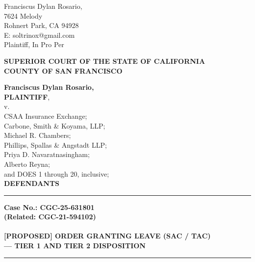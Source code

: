 

\nolinenumbers
\begin{singlespace}
Franciscus Dylan Rosario, \\
7624 Melody \\
Rohnert Park, CA 94928 \\
E: soltrinox@gmail.com \\
Plaintiff, In Pro Per \\
\end{singlespace}
\vspace*{9mm}
\begin{tightcenter}
\textbf{SUPERIOR COURT OF THE STATE OF CALIFORNIA} \\
\textbf{COUNTY OF SAN FRANCISCO}
\end{tightcenter}
\vspace*{2.25mm}
\nolinenumbers
\begin{minipage}[t]{3in}
    \raggedright
    \textbf{Franciscus Dylan Rosario,} \\ \textbf{PLAINTIFF}, \\
    \hspace{1cm} v. \\
    \small
    CSAA Insurance Exchange; \\
    Carbone, Smith \& Koyama, LLP; \\
    Michael R. Chambers; \\
    Phillips, Spallas \& Angstadt LLP; \\
    Priya D. Navaratnasingham; \\
    Alberto Reyna; \\
    and DOES 1 through 20, inclusive; \\
    \normalsize
    \textbf{DEFENDANTS}
    \makebox[3in]{\hrulefill}
\end{minipage}%
\hspace{3mm}
\begin{minipage}[t]{0.5pt}
    \vspace{0pt}
    \rule{0.5pt}{3.1in}
\end{minipage}
\hspace{3mm}
\begin{minipage}[t]{3in}
    \raggedright
    \noindent \textbf{Case No.: CGC-25-631801} \\
    \textbf{(Related: CGC-21-594102)} \\
    ~\\
    \textbf{[PROPOSED] ORDER GRANTING LEAVE (SAC / TAC)} \\
    \textbf{— TIER 1 AND TIER 2 DISPOSITION}
\end{minipage}
\vspace*{6mm}
\nolinenumbers
\begin{center}\rule{0.5\linewidth}{0.5pt}\end{center}

